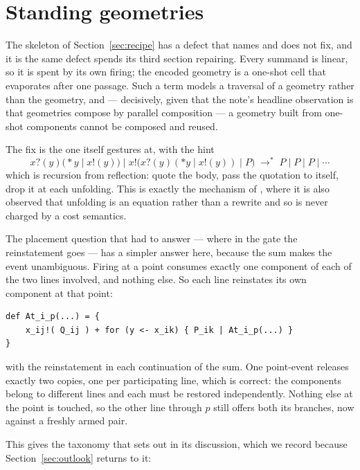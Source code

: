 \documentclass[11pt]{article}
\theoremstyle{plain}
\theoremstyle{definition}
\theoremstyle{remark}
\begin{document}
\section{Standing geometries}
\label{sec:standing}

The skeleton of Section~\ref{sec:recipe} has a defect that \cite{Fano05} names and does
not fix, and it is the same defect \cite{KnotsNote} spends its third section repairing.
Every summand is linear, so it is spent by its own firing; the encoded geometry is a
one-shot cell that evaporates after one passage. Such a term models a traversal of a
geometry rather than the geometry, and --- decisively, given that the note's headline
observation is that geometries compose by parallel composition --- a geometry built from
one-shot components cannot be composed and reused.

The fix is the one \cite{Fano05} itself gestures at, with the hint
\[
x?(y)\big({*}y \mid x!(y)\big) \;\big|\; x!\big(x?(y)({*}y \mid x!(y)) \mid P\big)
\;\longrightarrow^{*}\; P \mid P \mid P \mid \cdots
\]
which is recursion from reflection: quote the body, pass the quotation to itself, drop it
at each unfolding. This is exactly the mechanism of \cite[Remark 1]{KnotsNote}, where it is
also observed that unfolding is an equation rather than a rewrite and so is never charged
by a cost semantics.

The placement question that \cite{KnotsNote} had to answer --- where in the gate the
reinstatement goes --- has a simpler answer here, because the sum makes the event
unambiguous. Firing at a point consumes exactly one component of each of the two lines
involved, and nothing else. So each line reinstates its own component at that point:

\begin{lstlisting}
def At_i_p(...) = {
    x_ij!( Q_ij ) + for (y <- x_ik) { P_ik | At_i_p(...) }
}
\end{lstlisting}

with the reinstatement in each continuation of the sum. One point-event releases exactly
two copies, one per participating line, which is correct: the components belong to
different lines and each must be restored independently. Nothing else at the point is
touched, so the other line through $p$ still offers both its branches, now against a
freshly armed pair.

This gives the taxonomy that \cite{Fano05} sets out in its discussion, which we record
because Section~\ref{sec:outlook} returns to it:
\end{document}
